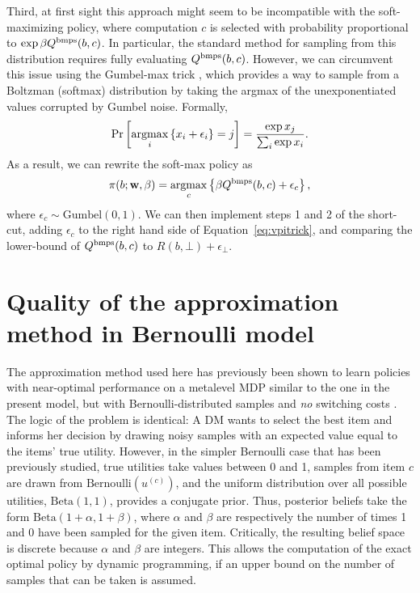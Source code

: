 Third, at first sight this approach might seem to be incompatible with the soft-maximizing policy, where computation $c$ is selected with probability proportional to $\exp\beta Q^{\mathrm{bmps}}(b,c)$. In particular, the standard method for sampling from this distribution requires fully evaluating $Q^{\mathrm{bmps}}(b,c)$. However, we can circumvent this issue using the Gumbel-max trick \citep{yellott1977relationship}, which provides a way to sample from a Boltzman (softmax) distribution by taking the argmax of the unexponentiated values corrupted by Gumbel noise. Formally,
%
\begin{equation}
  \Pr\left[\operatorname*{argmax}_{i}\left\{ x_{i}+\epsilon_{i}\right\} =j\right]=\frac{\exp x_{j}}{\sum_{i}\exp x_{i}}.
\end{equation}
%
As a result, we can rewrite the soft-max policy as 
%
\begin{equation}
  \pi(b;\mathbf{w},\beta)=\operatorname*{argmax}_{c}\left\{ \beta Q^{\mathrm{bmps}}(b, c) +\epsilon_{c}\right\} ,
\end{equation}
%
where $\epsilon_{c}\sim\text{Gumbel}(0,1)$. We can then implement steps 1 and 2 of the short-cut, adding $\epsilon_{c}$ to the right hand side of Equation~\ref{eq:vpitrick}, and comparing the lower-bound of $Q^{\mathrm{bmps}}(b, c)$ to $R(b, \bot) + \epsilon_\bot$.

\section{Quality of the approximation method in Bernoulli model}\label{app:attention-bernoulli}

The approximation method used here has previously been shown to learn policies with near-optimal performance on a metalevel MDP similar to the one in the present model, but with Bernoulli-distributed samples and \emph{no} switching costs \citep{callaway2018learning}. The logic of the problem is identical: A DM wants to select the best item and informs her decision by drawing noisy samples with an expected value  equal to the items' true utility. However, in the simpler Bernoulli case that has been previously studied, true utilities take values between 0 and 1, samples from item $c$ are drawn from $\text{Bernoulli}(u^{(c)})$,  and the  uniform distribution over all possible utilities, $\text{Beta}(1, 1)$, provides a conjugate prior. Thus, posterior beliefs take the form $\text{Beta}(1+α, 1+β)$, where $α$ and $β$ are respectively the number of times 1 and 0 have been sampled for the given item.  Critically, the resulting belief space is discrete because $α$ and $β$ are integers. This allows the computation of the exact optimal policy by dynamic programming, if an upper bound on the number of samples that can be taken is assumed. 

